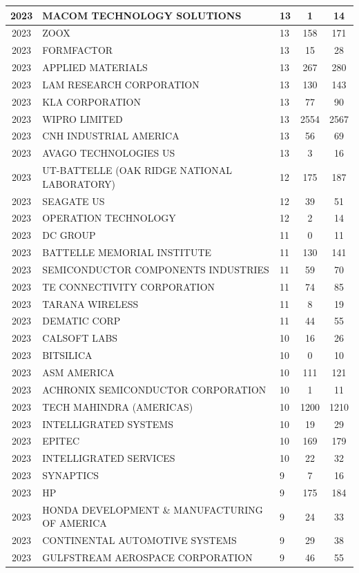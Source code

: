 \documentclass{article}%
\begin{document}
\begin{longtable}{c|p{20em}|p{5em}|c|c}
\hline%
2023&MACOM TECHNOLOGY SOLUTIONS&13&1&14\\%
\hline%
2023&ZOOX&13&158&171\\%
\hline%
2023&FORMFACTOR&13&15&28\\%
\hline%
2023&APPLIED MATERIALS&13&267&280\\%
\hline%
2023&LAM RESEARCH CORPORATION&13&130&143\\%
\hline%
2023&KLA CORPORATION&13&77&90\\%
\hline%
2023&WIPRO LIMITED&13&2554&2567\\%
\hline%
2023&CNH INDUSTRIAL AMERICA&13&56&69\\%
\hline%
2023&AVAGO TECHNOLOGIES US&13&3&16\\%
\hline%
2023&UT{-}BATTELLE  (OAK RIDGE NATIONAL LABORATORY)&12&175&187\\%
\hline%
2023&SEAGATE US&12&39&51\\%
\hline%
2023&OPERATION TECHNOLOGY&12&2&14\\%
\hline%
2023&DC GROUP&11&0&11\\%
\hline%
2023&BATTELLE MEMORIAL INSTITUTE&11&130&141\\%
\hline%
2023&SEMICONDUCTOR COMPONENTS INDUSTRIES&11&59&70\\%
\hline%
2023&TE CONNECTIVITY CORPORATION&11&74&85\\%
\hline%
2023&TARANA WIRELESS&11&8&19\\%
\hline%
2023&DEMATIC CORP&11&44&55\\%
\hline%
2023&CALSOFT LABS&10&16&26\\%
\hline%
2023&BITSILICA&10&0&10\\%
\hline%
2023&ASM AMERICA&10&111&121\\%
\hline%
2023&ACHRONIX SEMICONDUCTOR CORPORATION&10&1&11\\%
\hline%
2023&TECH MAHINDRA (AMERICAS)&10&1200&1210\\%
\hline%
2023&INTELLIGRATED SYSTEMS&10&19&29\\%
\hline%
2023&EPITEC&10&169&179\\%
\hline%
2023&INTELLIGRATED SERVICES&10&22&32\\%
\hline%
2023&SYNAPTICS&9&7&16\\%
\hline%
2023&HP&9&175&184\\%
\hline%
2023&HONDA DEVELOPMENT \& MANUFACTURING OF AMERICA&9&24&33\\%
\hline%
2023&CONTINENTAL AUTOMOTIVE SYSTEMS&9&29&38\\%
\hline%
2023&GULFSTREAM AEROSPACE CORPORATION&9&46&55\\%

\end{longtable}
\end{document}
